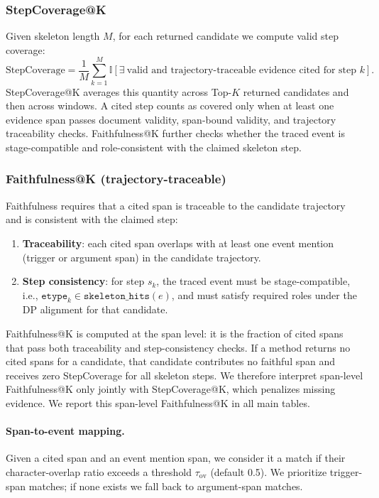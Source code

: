 \documentclass{article}
\begin{document}
\subsubsection{StepCoverage@K}
\label{sec:app_explain_stepcoverage}

Given skeleton length $M$, for each returned candidate we compute valid step coverage:
\begin{equation}
\mathrm{StepCoverage}=
\frac{1}{M}
\sum_{k=1}^{M}
\mathbb{I}[
\exists\ \text{valid and trajectory-traceable evidence cited for step }k
].
\end{equation}
StepCoverage@K averages this quantity across Top-$K$ returned candidates and then across windows.
A cited step counts as covered only when at least one evidence span passes document validity, span-bound validity, and trajectory traceability checks.
Faithfulness@K further checks whether the traced event is stage-compatible and role-consistent with the claimed skeleton step.

\subsubsection{Faithfulness@K (trajectory-traceable)}
\label{sec:app_explain_faithfulness}

Faithfulness requires that a cited span is traceable to the candidate trajectory and is consistent with the claimed step:
\begin{enumerate}
    \item \textbf{Traceability}: each cited span overlaps with at least one event mention (trigger or argument span) in the candidate trajectory.
    \item \textbf{Step consistency}: for step $s_k$, the traced event must be stage-compatible, i.e.,
    $\texttt{etype}_k\in\texttt{skeleton\_hits}(e)$, and must satisfy required roles under the DP alignment for that candidate.
\end{enumerate}
Faithfulness@K is computed at the span level: it is the fraction of cited spans that pass both traceability and step-consistency checks.
If a method returns no cited spans for a candidate, that candidate contributes no faithful span and receives zero StepCoverage for all skeleton steps.
We therefore interpret span-level Faithfulness@K only jointly with StepCoverage@K, which penalizes missing evidence.
We report this span-level Faithfulness@K in all main tables.

\paragraph{Span-to-event mapping.}
Given a cited span and an event mention span, we consider it a match if their character-overlap ratio exceeds a threshold $\tau_{\mathrm{ov}}$ (default 0.5).
We prioritize trigger-span matches; if none exists we fall back to argument-span matches.
\end{document}
